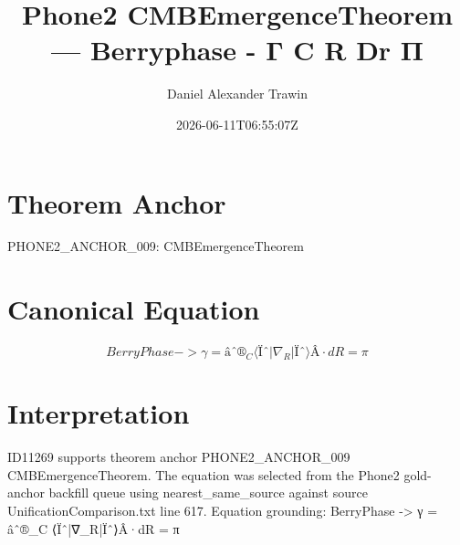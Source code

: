\documentclass[11pt]{article}
\title{Phone2 CMBEmergenceTheorem — Berryphase - Γ C R Dr Π}
\author{Daniel Alexander Trawin}
\date{2026-06-11T06:55:07Z}
\begin{document}
\maketitle
\section*{Theorem Anchor}
PHONE2_ANCHOR_009: CMBEmergenceTheorem
\section*{Canonical Equation}
\[
BerryPhase -> γ = âˆ®_C ⟨Ïˆ|∇_R|Ïˆ⟩Â·dR = π
\]
\section*{Interpretation}
ID11269 supports theorem anchor PHONE2_ANCHOR_009 CMBEmergenceTheorem. The equation was selected from the Phone2 gold-anchor backfill queue using nearest_same_source against source UnificationComparison.txt line 617. Equation grounding: BerryPhase -> γ = âˆ®_C ⟨Ïˆ|∇_R|Ïˆ⟩Â·dR = π
\end{document}
